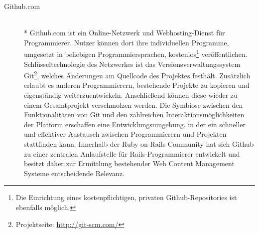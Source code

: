 \begin{description}
\begin{figure}[!h]
\begin{center}
\end{center}
\end{figure}
\newpage
\item[Github.com]\mbox{~}\\*
Github.com ist ein Online-Netzwerk und Webhosting-Dienst für Programmierer. Nutzer können dort ihre individuellen Programme, umgesetzt in beliebigen Programmiersprachen, kostenlos\footnote{Die Einrichtung eines kostenpflichtigen, privaten Github-Repositories ist ebenfalls möglich.}  veröffentlichen.
Schlüsseltechnologie des Netzwerkes ist das Versionsverwaltungssystem Git\footnote{Projektseite: \href{http://git-scm.com/}{http://git-scm.com/}}, welches Änderungen am Quellcode des Projektes festhält. Zusätzlich erlaubt es anderen Programmierern, bestehende Projekte zu kopieren und eigenständig weiterzuentwickeln. Anschließend können diese wieder zu einem Gesamtprojekt verschmolzen werden.
Die Symbiose zwischen den Funktionalitäten von Git und den zahlreichen Interaktionsmöglichkeiten der Platform erschaffen eine Entwicklungsumgebung, in der ein schneller und effektiver Austausch zwischen Programmierern und Projekten stattfinden kann.
Innerhalb der Ruby on Rails Community hat sich Github zu einer zentralen Anlaufstelle für Rails-Programmierer entwickelt und besitzt daher zur Ermittlung bestehender Web Content Management Systeme entscheidende Relevanz.

\end{description}

